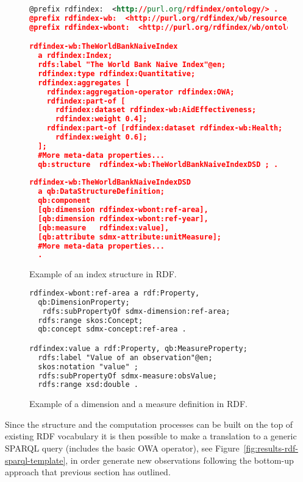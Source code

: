 \begin{figure}[!ht]
\begin{lstlisting}[language=XML,basicstyle=\scriptsize]  
@prefix rdfindex:  <http://purl.org/rdfindex/ontology/> .
@prefix rdfindex-wb:  <http://purl.org/rdfindex/wb/resource/> .
@prefix rdfindex-wbont:  <http://purl.org/rdfindex/wb/ontology/> .

rdfindex-wb:TheWorldBankNaiveIndex 
  a rdfindex:Index;
  rdfs:label "The World Bank Naive Index"@en;
  rdfindex:type rdfindex:Quantitative;
  rdfindex:aggregates [ 		
    rdfindex:aggregation-operator rdfindex:OWA;
    rdfindex:part-of [
      rdfindex:dataset rdfindex-wb:AidEffectiveness; 
      rdfindex:weight 0.4];
    rdfindex:part-of [rdfindex:dataset rdfindex-wb:Health; 
      rdfindex:weight 0.6];
  ];
  #More meta-data properties...
  qb:structure 	rdfindex-wb:TheWorldBankNaiveIndexDSD ; .
  
rdfindex-wb:TheWorldBankNaiveIndexDSD 
  a qb:DataStructureDefinition;  
  qb:component    
  [qb:dimension rdfindex-wbont:ref-area],
  [qb:dimension rdfindex-wbont:ref-year],
  [qb:measure   rdfindex:value],
  [qb:attribute sdmx-attribute:unitMeasure];
  #More meta-data properties...
  .
\end{lstlisting}
\caption{Example of an index structure in RDF.}
 \label{fig:results-rdf-index}
\end{figure}

\begin{figure}[!ht]
\begin{lstlisting}[language=XML,basicstyle=\scriptsize]  
rdfindex-wbont:ref-area a rdf:Property, 
  qb:DimensionProperty; 
   rdfs:subPropertyOf sdmx-dimension:ref-area; 
  rdfs:range skos:Concept; 
  qb:concept sdmx-concept:ref-area . 

rdfindex:value a rdf:Property, qb:MeasureProperty;
  rdfs:label "Value of an observation"@en;
  skos:notation "value" ;
  rdfs:subPropertyOf sdmx-measure:obsValue;
  rdfs:range xsd:double . 
\end{lstlisting}
\caption{Example of a dimension and a measure definition in RDF.}
 \label{fig:results-rdf-properties}
\end{figure}


Since the structure and the computation processes can be built on the top of existing RDF vocabulary it is then 
possible to make a translation to a generic SPARQL query (includes the basic OWA operator), see Figure~\ref{fig:results-rdf-sparql-template}, 
in order generate new observations following the bottom-up approach that previous section has outlined.

